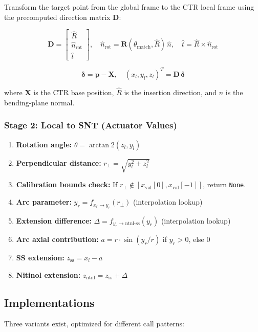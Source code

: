 \documentclass[11pt,a4paper]{article}
\begin{document}
Transform the target point from the global frame to the CTR local frame using the precomputed direction matrix $\mathbf{D}$:

\[
\mathbf{D} = \begin{bmatrix} \hat{R} \\ \hat{n}_\text{rot} \\ \hat{t} \end{bmatrix}, \quad
\hat{n}_\text{rot} = \mathbf{R}(\theta_\text{match}, \hat{R})\,\hat{n}, \quad
\hat{t} = \hat{R} \times \hat{n}_\text{rot}
\]

\[
\boldsymbol{\delta} = \mathbf{p} - \mathbf{X}, \quad
(x_l, y_l, z_l)^T = \mathbf{D}\,\boldsymbol{\delta}
\]

\noindent where $\mathbf{X}$ is the CTR base position, $\hat{R}$ is the insertion direction, and $\hat{n}$ is the bending-plane normal.

\subsubsection{Stage 2: Local to SNT (Actuator Values)}

\begin{enumerate}[nosep]
    \item \textbf{Rotation angle:} $\theta = \arctan2(z_l, y_l)$
    \item \textbf{Perpendicular distance:} $r_\perp = \sqrt{y_l^2 + z_l^2}$
    \item \textbf{Calibration bounds check:} If $r_\perp \notin [x_\text{val}[0], x_\text{val}[-1]]$, return \texttt{None}.
    \item \textbf{Arc parameter:} $y_r = f_{x_r \to y_r}(r_\perp)$ \quad (interpolation lookup)
    \item \textbf{Extension difference:} $\Delta = f_{y_r \to \text{ntnl-ss}}(y_r)$ \quad (interpolation lookup)
    \item \textbf{Arc axial contribution:} $a = r \cdot \sin(y_r / r)$ if $y_r > 0$, else $0$
    \item \textbf{SS extension:} $z_\text{ss} = x_l - a$
    \item \textbf{Nitinol extension:} $z_\text{ntnl} = z_\text{ss} + \Delta$
\end{enumerate}

\subsection{Implementations}

Three variants exist, optimized for different call patterns:
\end{document}
